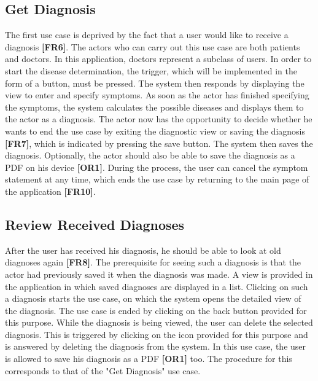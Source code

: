 \subsection{Get Diagnosis}
The first use case is deprived by the fact that a user would like to receive a diagnosis \textbf{[FR6]}. The actors who can carry out this use case are both patients and doctors. In this application, doctors represent a subclass of users. In order to start the disease determination, the trigger, which will be implemented in the form of a button, must be pressed. The system then responds by displaying the view to enter and specify symptoms. As soon as the actor has finished specifying the symptoms, the system calculates the possible diseases and displays them to the actor as a diagnosis. The actor now has the opportunity to decide whether he wants to end the use case by exiting the diagnostic view or saving the diagnosis \textbf{[FR7]}, which is indicated by pressing the save button. The system then saves the diagnosis. Optionally, the actor should also be able to save the diagnosis as a PDF on his device \textbf{[OR1]}. During the process, the user can cancel the symptom statement at any time, which ends the use case by returning to the main page of the application \textbf{[FR10]}.

\subsection{Review Received Diagnoses}
After the user has received his diagnosis, he should be able to look at old diagnoses again \textbf{[FR8]}. The prerequisite for seeing such a diagnosis is that the actor had previously saved it when the diagnosis was made. A view is provided in the application in which saved diagnoses are displayed in a list. Clicking on such a diagnosis starts the use case, on which the system opens the detailed view of the diagnosis. The use case is ended by clicking on the back button provided for this purpose. While the diagnosis is being viewed, the user can delete the selected diagnosis. This is triggered by clicking on the icon provided for this purpose and is answered by deleting the diagnosis from the system. In this use case, the user is allowed to save his diagnosis as a PDF \textbf{[OR1]} too. The procedure for this corresponds to that of the "Get Diagnosis" use case.

